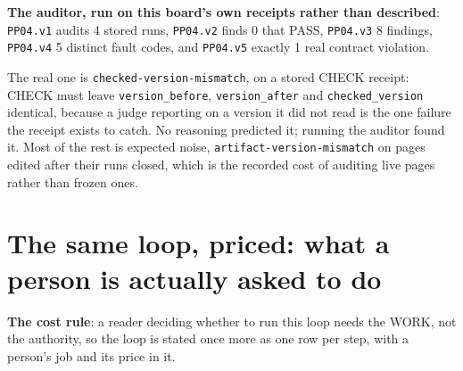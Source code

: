 \textbf{The auditor, run on this board's own receipts rather than described}: \texttt{PP04.v1} audits 4 stored runs, \texttt{PP04.v2} finds 0 that PASS, \texttt{PP04.v3} 8 findings, \texttt{PP04.v4} 5 distinct fault codes, and \texttt{PP04.v5} exactly 1 real contract violation.

The real one is \texttt{checked-version-mismatch}, on a stored CHECK receipt: CHECK must leave \texttt{version\_before}, \texttt{version\_after} and \texttt{checked\_version} identical, because a judge reporting on a version it did not read is the one failure the receipt exists to catch. No reasoning predicted it; running the auditor found it. Most of the rest is expected noise, \texttt{artifact-version-mismatch} on pages edited after their runs closed, which is the recorded cost of auditing live pages rather than frozen ones.


\section{The same loop, priced: what a person is actually asked to do}
\textbf{The cost rule}: a reader deciding whether to run this loop needs the WORK, not the authority, so the loop is stated once more as one row per step, with a person's job and its price in it.


